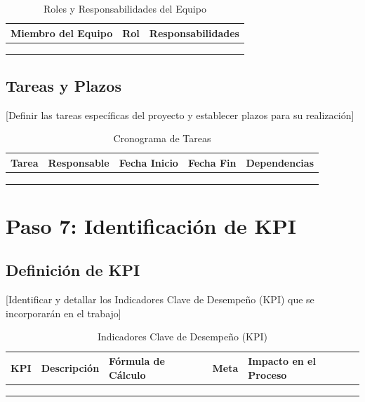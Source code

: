 \documentclass[12pt,letterpaper]{report}
\begin{document}
\begin{table}[H]
    \centering
    \begin{tabularx}{\textwidth}{|X|X|X|}
        \hline
        \textbf{Miembro del Equipo} & \textbf{Rol} & \textbf{Responsabilidades} \\
        \hline
        & & \\
        \hline
        & & \\
        \hline
        & & \\
        \hline
    \end{tabularx}
    \caption{Roles y Responsabilidades del Equipo}
\end{table}

\subsection{Tareas y Plazos}
[Definir las tareas específicas del proyecto y establecer plazos para su realización]

\begin{table}[H]
    \centering
    \begin{tabularx}{\textwidth}{|X|X|X|X|X|}
        \hline
        \textbf{Tarea} & \textbf{Responsable} & \textbf{Fecha Inicio} & \textbf{Fecha Fin} & \textbf{Dependencias} \\
        \hline
        & & & & \\
        \hline
        & & & & \\
        \hline
        & & & & \\
        \hline
    \end{tabularx}
    \caption{Cronograma de Tareas}
\end{table}

\section{Paso 7: Identificación de KPI}

\subsection{Definición de KPI}
[Identificar y detallar los Indicadores Clave de Desempeño (KPI) que se incorporarán en el trabajo]

\begin{table}[H]
    \centering
    \begin{tabularx}{\textwidth}{|X|X|X|X|X|}
        \hline
        \textbf{KPI} & \textbf{Descripción} & \textbf{Fórmula de Cálculo} & \textbf{Meta} & \textbf{Impacto en el Proceso} \\
        \hline
        & & & & \\
        \hline
        & & & & \\
        \hline
        & & & & \\
        \hline
    \end{tabularx}
    \caption{Indicadores Clave de Desempeño (KPI)}
\end{table}
\end{document}

